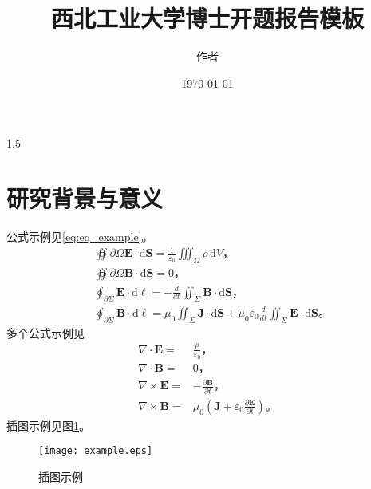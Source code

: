 \documentclass[a4paper,12pt]{NPUResearchProposal}
\newcommand{\linespacing}{1.5}
\begin{document}
\title{西北工业大学博士开题报告模板}

\author{作者}
\AppResearch %
\date{\today}       
\maketitle

\begin{spacing}{\linespacing}

\section{研究背景与意义}
\label{sec:background}
公式示例见\eqref{eq:eq_example}。
\begin{equation}
  \label{eq:eq_example}
  \begin{split}
    &\oiint{\scriptstyle\partial \Omega
    }\mathbf{E}\cdot\mathrm{d}\mathbf{S} = \frac{1}{\varepsilon_0}
    \iiint_\Omega \rho \,\mathrm{d}V\textit{，}\\
   & \oiint{\scriptstyle \partial \Omega
    }\mathbf{B}\cdot\mathrm{d}\mathbf{S} = 0\textit{，}\\
    &\oint_{\partial \Sigma} \mathbf{E} \cdot
    \mathrm{d}\boldsymbol{\ell} = - \frac{d}{dt} \iint_{\Sigma}
    \mathbf{B} \cdot \mathrm{d}\mathbf{S} \textit{，}\\
    &\oint_{\partial \Sigma} \mathbf{B} \cdot \mathrm{d}\boldsymbol{\ell} = \mu_0 \iint_{\Sigma} \mathbf{J} \cdot \mathrm{d}\mathbf{S} + \mu_0 \varepsilon_0 \frac{d}{dt} \iint_{\Sigma} \mathbf{E} \cdot \mathrm{d}\mathbf{S}\textit{。}
  \end{split}
\end{equation}
多个公式示例见
\begin{subequations}
  \begin{align}\label{eq:eq_example2}
    \nabla \cdot \mathbf{E} = &\frac {\rho} {\varepsilon_0}\textit{，}\\
    \nabla \cdot \mathbf{B} =& 0\textit{，}\\
    \nabla \times \mathbf{E} =& -\frac{\partial \mathbf{B}} {\partial
      t}\textit{，}\\
    \nabla \times \mathbf{B} = &\mu_0\left(\mathbf{J} + \varepsilon_0 \frac{\partial \mathbf{E}} {\partial t} \right) \textit{。}
  \end{align}
\end{subequations}
插图示例见图\ref{fig:fig_example}。
\begin{figure}[!h]
  \centering
  \texttt{[image: example.eps]}
  \caption{插图示例}
  \label{fig:fig_example}
\end{figure}


\end{spacing}
\end{document}
